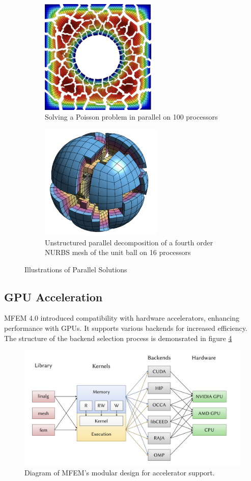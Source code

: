 \begin{figure}[H]
    \centering
    \begin{subfigure}[t]{0.45\textwidth}
        \centering
        \includegraphics[height=5.5cm,keepaspectratio]{figures/f2_1.png}
        \caption{Solving a Poisson problem in parallel on 100 processors}
        \label{fig:2.1}
    \end{subfigure}
    \hfill
    \begin{subfigure}[t]{0.45\textwidth}
        \centering
        \includegraphics[height=5.5cm,keepaspectratio]{figures/f2_2.png}
        \caption{Unstructured parallel decomposition of a fourth order NURBS mesh of the unit ball on 16 processors}
        \label{fig:2.2}
    \end{subfigure}
    \caption{Illustrations of Parallel Solutions}
    \label{fig:2}
\end{figure}



\subsection{GPU Acceleration}
MFEM 4.0 introduced compatibility with hardware accelerators, enhancing performance with GPUs. It supports various backends for increased efficiency. The structure of the backend selection process is demonsrated in figure \ref{figure_3}

\begin{figure}[H]
    \centering
    \includegraphics[width=1.0\textwidth]{figures/f3.png}
    \caption{Diagram of MFEM’s modular design for accelerator support. }
    \label{figure_3}
\end{figure}

